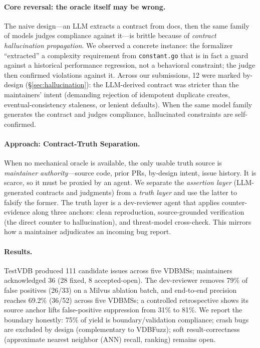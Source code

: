 \documentclass[sigconf, anonymous, review]{acmart}
\begin{document}
\paragraph{Core reversal: the oracle itself may be wrong.}
The naive design---an LLM extracts a contract from docs, then the same family of models judges compliance against it---is brittle because of \emph{contract hallucination propagation}. We observed a concrete instance: the formalizer ``extracted'' a complexity requirement from \texttt{constant.go} that is in fact a guard against a historical performance regression, not a behavioral constraint; the judge then confirmed violations against it. Across our submissions, 12 were marked by-design (\S\ref{sec:hallucination}): the LLM-derived contract was stricter than the maintainers' intent (demanding rejection of idempotent duplicate creates, eventual-consistency staleness, or lenient defaults). When the same model family generates the contract and judges compliance, hallucinated constraints are self-confirmed.

\paragraph{Approach: Contract-Truth Separation.}
When no mechanical oracle is available, the only usable truth source is \emph{maintainer authority}---source code, prior PRs, by-design intent, issue history. It is scarce, so it must be proxied by an agent. We separate the \emph{assertion layer} (LLM-generated contracts and judgments) from a \emph{truth layer} and use the latter to falsify the former. The truth layer is a dev-reviewer agent that applies counter-evidence along three anchors: clean reproduction, source-grounded verification (the direct counter to hallucination), and threat-model cross-check. This mirrors how a maintainer adjudicates an incoming bug report.

\paragraph{Results.}
TestVDB produced 111 candidate issues across five VDBMSs; maintainers acknowledged 36 (28 fixed, 8 accepted-open). The dev-reviewer removes 79\% of false positives (26/33) on a Milvus ablation batch, and end-to-end precision reaches 69.2\% (36/52) across five VDBMSs; a controlled retrospective shows its source anchor lifts false-positive suppression from 31\% to 81\%. We report the boundary honestly: 75\% of yield is boundary/validation compliance; crash bugs are excluded by design (complementary to VDBFuzz); soft result-correctness (approximate nearest neighbor (ANN) recall, ranking) remains open.
\end{document}
